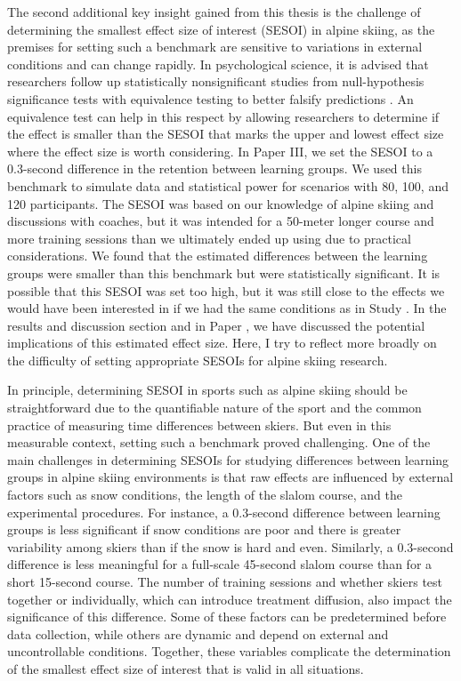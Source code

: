 The second additional key insight gained from this thesis is the challenge of determining the smallest effect size of interest (SESOI) in alpine skiing, as the premises for setting such a benchmark are sensitive to variations in external conditions and can change rapidly. In psychological science, it is advised that researchers follow up statistically nonsignificant studies from null-hypothesis significance tests with equivalence testing to better falsify predictions \parencite{lakens_equivalence_2018}. An equivalence test can help in this respect by allowing researchers to determine if the effect is smaller than the SESOI that marks the upper and lowest effect size where the effect size is worth considering. In Paper III, we set the SESOI to a 0.3-second difference in the retention between learning groups. We used this benchmark to simulate data and statistical power for scenarios with 80, 100, and 120 participants. The SESOI was based on our knowledge of alpine skiing and discussions with coaches, but it was intended for a 50-meter longer course and more training sessions than we ultimately ended up using due to practical considerations. We found that the estimated differences between the learning groups were smaller than this benchmark but were statistically significant. It is possible that this SESOI was set too high, but it was still close to the effects we would have been interested in if we had the same conditions as in Study . In the results and discussion section and in Paper , we have discussed the potential implications of this estimated effect size. Here, I try to reflect more broadly on the difficulty of setting appropriate SESOIs for alpine skiing research.

In principle, determining SESOI in sports such as alpine skiing should be straightforward due to the quantifiable nature of the sport and the common practice of measuring time differences between skiers. But even in this measurable context, setting such a benchmark proved challenging. One of the main challenges in determining SESOIs for studying differences between learning groups in alpine skiing environments is that raw effects are influenced by external factors such as snow conditions, the length of the slalom course, and the experimental procedures. For instance, a 0.3-second difference between learning groups is less significant if snow conditions are poor and there is greater variability among skiers than if the snow is hard and even. Similarly, a 0.3-second difference is less meaningful for a full-scale 45-second slalom course than for a short 15-second course. The number of training sessions and whether skiers test together or individually, which can introduce treatment diffusion, also impact the significance of this difference. Some of these factors can be predetermined before data collection, while others are dynamic and depend on external and uncontrollable conditions. Together, these variables complicate the determination of the smallest effect size of interest that is valid in all situations. 

